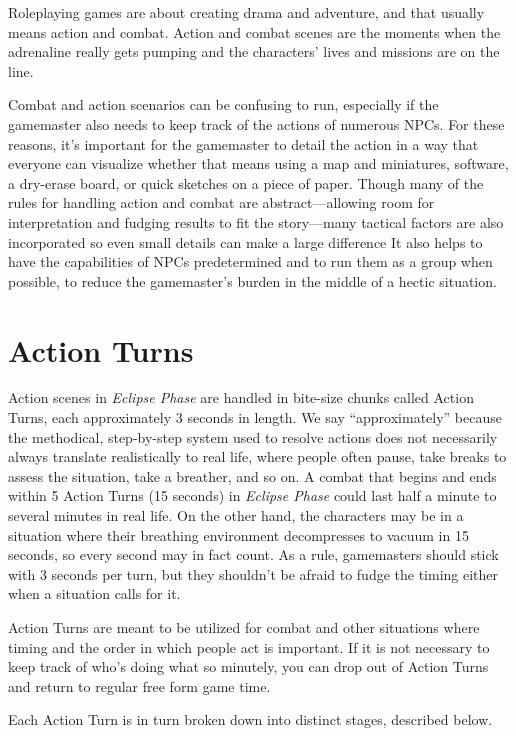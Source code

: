 Roleplaying games are about creating drama and 
adventure, and that usually means action and 
combat. Action and combat scenes are the moments 
when the adrenaline really gets pumping and the 
characters' lives and missions are on the line.

Combat and action scenarios can be confusing 
to run, especially if the gamemaster also needs to 
keep track of the actions of numerous NPCs. For 
these reasons, it's important for the gamemaster to 
detail the action in a way that everyone can visualize
whether that means using a map and miniatures,
software, a dry-erase board, or quick sketches on 
a piece of paper. Though many of the rules for 
handling action and combat are abstract—allowing 
room for interpretation and fudging results to fit 
the story—many tactical factors are also incorporated
so even small details can make a large difference
It also helps to have the capabilities of NPCs
predetermined and to run them as a group when 
possible, to reduce the gamemaster's burden in the 
middle of a hectic situation.

\section{Action Turns}

Action scenes in \textit{Eclipse Phase} are handled in bite-size
chunks called Action Turns, each approximately
3 seconds in length. We say ``approximately'' because
the methodical, step-by-step system used to
resolve actions does not necessarily always translate 
realistically to real life, where people often pause, 
take breaks to assess the situation, take a breather, 
and so on. A combat that begins and ends within 5 
Action Turns (15 seconds) in \textit{Eclipse Phase} could 
last half a minute to several minutes in real life. On 
the other hand, the characters may be in a situation 
where their breathing environment decompresses to 
vacuum in 15 seconds, so every second may in fact 
count. As a rule, gamemasters should stick with 3 
seconds per turn, but they shouldn't be afraid to 
fudge the timing either when a situation calls for it.

Action Turns are meant to be utilized for combat 
and other situations where timing and the order in 
which people act is important. If it is not necessary 
to keep track of who's doing what so minutely, you 
can drop out of Action Turns and return to regular
free form game time.

Each Action Turn is in turn broken down into 
distinct stages, described below.


